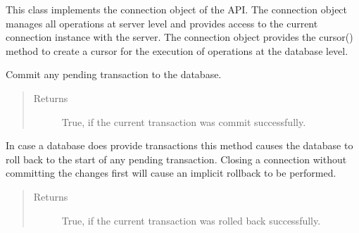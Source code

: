 \documentclass[letterpaper,10pt,english]{sphinxmanual}
\begin{document}
\begin{fulllineitems}
\label{\detokenize{index:id0}}
This class implements the connection object of the  API. The connection object manages all operations at server
level and provides access to the current connection instance with the server. The connection object provides the
cursor() method to create a cursor for the execution of operations at the database level.

\begin{fulllineitems}
\label{\detokenize{index:secondodb.api.secondoapi.Connection.commit}}
Commit any pending transaction to the database.
\begin{quote}\begin{description}
\item[{Returns}] \leavevmode
True, if the current transaction was commit successfully.

\end{description}\end{quote}

\end{fulllineitems}


\begin{fulllineitems}
\label{\detokenize{index:secondodb.api.secondoapi.Connection.rollback}}
In case a database does provide transactions this method causes the database to roll back to the start of any
pending transaction. Closing a connection without committing the changes first will cause an implicit rollback
to be performed.
\begin{quote}\begin{description}
\item[{Returns}] \leavevmode
True, if the current transaction was rolled back successfully.

\end{description}\end{quote}

\end{fulllineitems}


\end{fulllineitems}
\end{document}
